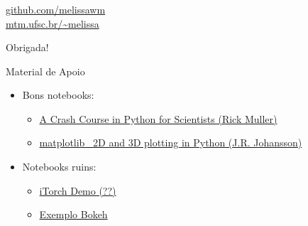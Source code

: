 \documentclass[10pt]{beamer}
\begin{document}
\begin{frame}[fragile]
   \frametitle{}
   \begin{center}
      \begin{minipage}{0.7\textwidth}
      \begin{block}{}
         \begin{center}
            \href{https://github.com/melissawm}{github.com/melissawm}\\
            \href{http://www.mtm.ufsc.br/~melissa}{mtm.ufsc.br/\~{}melissa}
         \end{center}
      \end{block}
    \end{minipage}
    \vfill

    Obrigada!
   \end{center}
\end{frame}

\begin{frame}{Material de Apoio}

	\begin{itemize}
	\item Bons notebooks:
    \begin{itemize}
    \item \href{http://nbviewer.jupyter.org/gist/rpmuller/5920182}{A Crash Course in Python for Scientists (Rick Muller)}
    \item \href{http://nbviewer.jupyter.org/github/jrjohansson/scientific-python-lectures/blob/master/Lecture-4-Matplotlib.ipynb}{matplotlib \textemdash\ 2D and 3D plotting in Python (J.R. Johansson)}
    \end{itemize}
    \item Notebooks ruins:
    \begin{itemize}
    \item \href{http://nbviewer.jupyter.org/github/facebook/iTorch/blob/master/iTorch_Demo.ipynb}{iTorch Demo (??)}
    \item \href{http://nbviewer.jupyter.org/github/bokeh/bokeh-notebooks/blob/master/gallery/texas.ipynb}{Exemplo Bokeh}
    \end{itemize}
    \end{itemize}
\end{frame}
\end{document}
